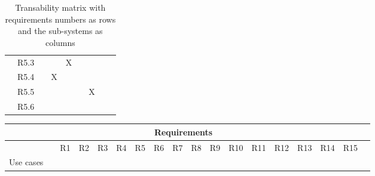 \documentclass[hidelinks, 12pt, a4paper]{article}
\begin{document}
\begin{table}[H]
\begin{tabular}{|l|l|l|c|c|c|c|c|c|}
             & R5.3 &     &     & X   &     &     &     &     \\ \cline{2-9}
             & R5.4 &     & X   &     &     &     &     &     \\ \cline{2-9}
             & R5.5 &     &     &     &     & X   &     &     \\ \cline{2-9}
             & R5.6 &     &     &     &     &     &     &     \\ \cline{1-9}
      \end{tabular}
      \vspace{1cm}
      \caption{Transability matrix with requirements numbers as rows and the sub-systems as columns}
      \label{table:Could-haveRequirementsTraceabilityMatrix}
\end{table}

\begin{table}[H]
      \centering
      \begin{tabular}{|l|l|l|c|c|c|c|c|c|c|c|c|c|c|c|c|c|c|}
            \hline

            \multicolumn{17}{|c|}{Requirements}                                                       \\ \hline
             &       & R1 & R2 & R3 & R4 & R5 & R6 & R7 & R8 & R9 & R10 & R11 & R12 & R13 & R14 & R15 \\ \hline
            \multirow{29}{*}{Use cases}


\end{tabular}
\end{table}
\end{document}
